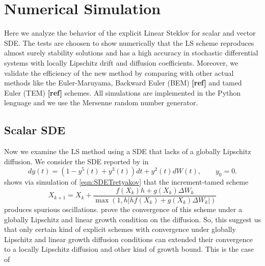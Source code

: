 \documentclass[sort&compress, preprint]{elsarticle}
\theoremstyle{definition}
\theoremstyle{plain}%
\theoremstyle{remark}
\newcommand{\SM}{LS\xspace}
\begin{document}
\section{Numerical Simulation}
Here we analyze the behavior of the explicit Linear Steklov  for scalar and vector SDE. The tests are 
choosen to show numerically  that  the LS scheme reproduces almost surely stability solutions and has a high accuracy in 
stochastic differential systems  with locally Lipschitz drift and diffusion coefficients. Moreover, we validate 
the efficiency of the new method  by comparing with other actual methods like the Euler-Maruyama, 
Backward Euler (BEM) {\bf[ref]} and tamed Euler (TEM)  {\bf[ref]} schemes. All simulations are implemented in the Python lenguage and we use 
the Mersenne random number generator.

\subsection{Scalar SDE}
Now we examine the \SM method using a SDE that lacks of a globally  Lipschitz diffusion. We 
consider the SDE
	reported by \citeauthor*{Tretyakov2013} in \cite[Eq. (5.6)]{Tretyakov2013}
	\begin{equation}\label{eqn:SDETretyakov}
		dy(t) =
		\left(
			1-y^5(t) +y^3(t)  
		\right) dt
		+
		y^2(t) dW(t), \qquad y_0=0.
	\end{equation}
	\citeauthor{Tretyakov2013} shows via simulation of \eqref{eqn:SDETretyakov} that the increment-tamed scheme
	\cite[Eq(1.5)]{Hutzenthaler2015}
	\begin{equation}\label{eqn:Increment-Tamed}
		X_{k+1} = X_k + 
			\frac{
				f(X_k) h + 
				g(X_k)\Delta W_k 
			}{
			\max\left(
				1, h
				\left|
					h f(X_k) +
					g(X_k)\Delta W_k
				\right|
			\right)}
	\end{equation}
	produces spurious oscillations. \citeauthor{Hutzenthaler2015} prove the convergence of this scheme under a 
	globally Lipschitz and linear growth condition on the diffusion. So, this suggest us that only certain kind of 
	explicit schemes with convergence under globally Lipschitz and linear growth diffusion conditions	
	can extended their convergence to a locally Lipschitz diffusion and other kind of growth bound. This is the case of 
\end{document}

